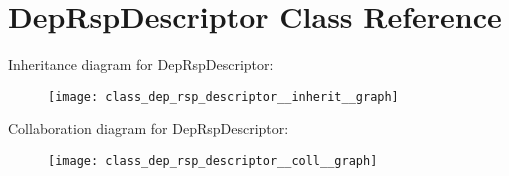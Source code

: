 \hypertarget{class_dep_rsp_descriptor}{}\section{Dep\+Rsp\+Descriptor Class Reference}
\label{class_dep_rsp_descriptor}


Inheritance diagram for Dep\+Rsp\+Descriptor\+:\nopagebreak
\begin{figure}[H]
\begin{center}
\leavevmode
\texttt{[image: class\_dep\_rsp\_descriptor\_\_inherit\_\_graph]}
\end{center}
\end{figure}


Collaboration diagram for Dep\+Rsp\+Descriptor\+:\nopagebreak
\begin{figure}[H]
\begin{center}
\leavevmode
\texttt{[image: class\_dep\_rsp\_descriptor\_\_coll\_\_graph]}
\end{center}
\end{figure}

